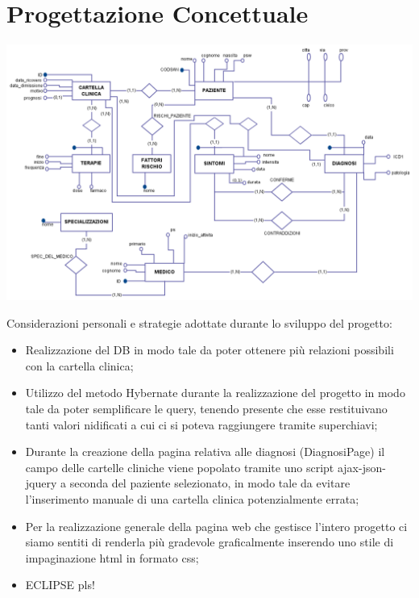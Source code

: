 \documentclass[a4paper,titlepage]{article}
\begin{document}
\begin{frontespizio}


\end{frontespizio}

\tableofcontents

\newpage

\part{Progettazione Concettuale}

    \begin{center}

    \centering
    \includegraphics[scale=0.40]{ER.png}

    \end{center}

Considerazioni personali e strategie adottate durante lo sviluppo del progetto:

\begin{itemize}[leftmargin=1.5cm, topsep=0.5cm, itemsep=0.2cm]

\item Realizzazione del DB in modo tale da poter ottenere più relazioni possibili con la cartella clinica;
\item Utilizzo del metodo Hybernate durante la realizzazione del progetto in modo tale da poter semplificare le query, tenendo presente che esse restituivano tanti valori nidificati a cui ci si poteva raggiungere tramite superchiavi;
\item Durante la creazione della pagina relativa alle diagnosi (DiagnosiPage) il campo delle cartelle cliniche viene popolato tramite uno script ajax-json-jquery a seconda del paziente selezionato, in modo tale da evitare l'inserimento manuale di una cartella clinica potenzialmente errata;
\item Per la realizzazione generale della pagina web che gestisce l'intero progetto ci siamo sentiti di renderla più gradevole graficalmente inserendo uno stile di impaginazione html in formato css;
\item ECLIPSE pls!


\end{itemize}
\end{document}
